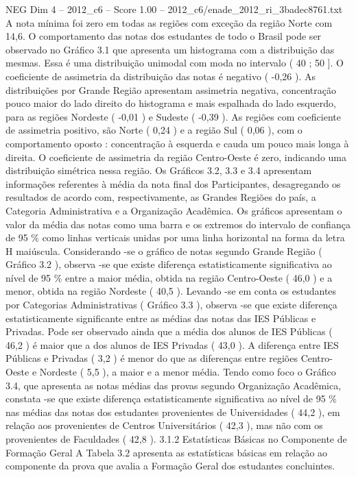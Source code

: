 \begin{textsample}{NEG Dim 4 – 2012\_c6 – Score 1.00 – 2012\_c6/enade\_2012\_ri\_3badec8761.txt}
A nota mínima foi zero em todas as regiões com exceção da região Norte com 14,6.
O comportamento das notas dos estudantes de todo o Brasil pode ser observado no Gráfico 3.1 que apresenta um histograma com a distribuição das mesmas.
Essa é uma distribuição unimodal com moda no intervalo ( 40 ; 50 ].
O coeficiente de assimetria da distribuição das notas é negativo ( -0,26 ).
As distribuições por Grande Região apresentam assimetria negativa, concentração pouco maior do lado direito do histograma e mais espalhada do lado esquerdo, para as regiões Nordeste ( -0,01 ) e Sudeste ( -0,39 ).
As regiões com coeficiente de assimetria positivo, são Norte ( 0,24 ) e a região Sul ( 0,06 ), com o comportamento oposto : concentração à esquerda e cauda um pouco mais longa à direita.
O coeficiente de assimetria da região Centro-Oeste é zero, indicando uma distribuição simétrica nessa região.
Os Gráficos 3.2, 3.3 e 3.4 apresentam informações referentes à média da nota final dos Participantes, desagregando os resultados de acordo com, respectivamente, as Grandes Regiões do país, a Categoria Administrativa e a Organização Acadêmica.
Os gráficos apresentam o valor da média das notas como uma barra e os extremos do intervalo de confiança de 95 \% como linhas verticais unidas por uma linha horizontal na forma da letra H maiúscula.
Considerando -se o gráfico de notas segundo Grande Região ( Gráfico 3.2 ), observa -se que existe diferença estatisticamente significativa ao nível de 95 \% entre a maior média, obtida na região Centro-Oeste ( 46,0 ) e a menor, obtida na região Nordeste ( 40,5 ).
Levando -se em conta os estudantes por Categorias Administrativas ( Gráfico 3.3 ), observa -se que existe diferença estatisticamente significante entre as médias das notas das IES Públicas e Privadas.
Pode ser observado ainda que a média dos alunos de IES Públicas ( 46,2 ) é maior que a dos alunos de IES Privadas ( 43,0 ).
A diferença entre IES Públicas e Privadas ( 3,2 ) é menor do que as diferenças entre regiões Centro-Oeste e Nordeste ( 5,5 ), a maior e a menor média.
Tendo como foco o Gráfico 3.4, que apresenta as notas médias das provas segundo Organização Acadêmica, constata -se que existe diferença estatisticamente significativa ao nível de 95 \% nas médias das notas dos estudantes provenientes de Universidades ( 44,2 ), em relação aos provenientes de Centros Universitários ( 42,3 ), mas não com os provenientes de Faculdades ( 42,8 ). 3.1.2 Estatísticas Básicas no Componente de Formação Geral A Tabela 3.2 apresenta as estatísticas básicas em relação ao componente da prova que avalia a Formação Geral dos estudantes concluintes.

\end{textsample}
